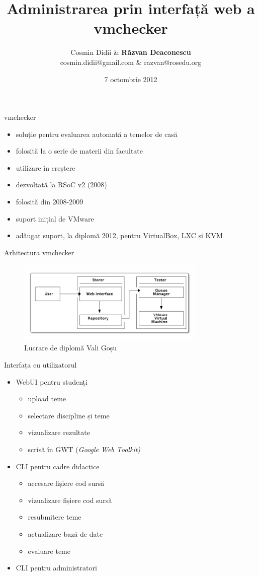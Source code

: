 \documentclass{beamer}
\title[vmchecker]{Administrarea prin interfață web a vmchecker}
\institute{ROSEdu Summer of Code}
\author[Răzvan Deaconescu]{Cosmin Didii \& \textbf{Răzvan Deaconescu} \\
cosmin.didii@gmail.com \& razvan@rosedu.org}
\date{7 octombrie 2012}
\begin{document}
\frame{\titlepage}

\begin{frame}{vmchecker}
  \begin{itemize}
    \item soluție pentru evaluarea automată a temelor de casă
    \item folosită la o serie de materii din facultate
    \item utilizare în creștere
    \item dezvoltată la RSoC v2 (2008)
    \item folosită din 2008-2009
    \item suport inițial de VMware
    \item adăugat suport, la diplomă 2012, pentru VirtualBox, LXC și KVM
  \end{itemize}
\end{frame}

\begin{frame}{Arhitectura vmchecker}
  \begin{figure}
    \centering
    \includegraphics[width=0.8\textwidth]{img/vmchecker-architecture} \\
    \tiny{Lucrare de diplomă Vali Goșu}
  \end{figure}
\end{frame}

\begin{frame}{Interfața cu utilizatorul}
  \begin{itemize}
    \item WebUI pentru studenți
      \begin{itemize}
        \item upload teme
        \item selectare discipline și teme
        \item vizualizare rezultate
        \item scrisă în GWT (\textit{Google Web Toolkit)}
      \end{itemize}
    \item CLI pentru cadre didactice
      \begin{itemize}
        \item accesare fișiere cod sursă
        \item vizualizare fișiere cod sursă
        \item resubmitere teme
        \item actualizare bază de date
        \item evaluare teme
      \end{itemize}
    \item CLI pentru administratori
  \end{itemize}
\end{frame}
\end{document}
